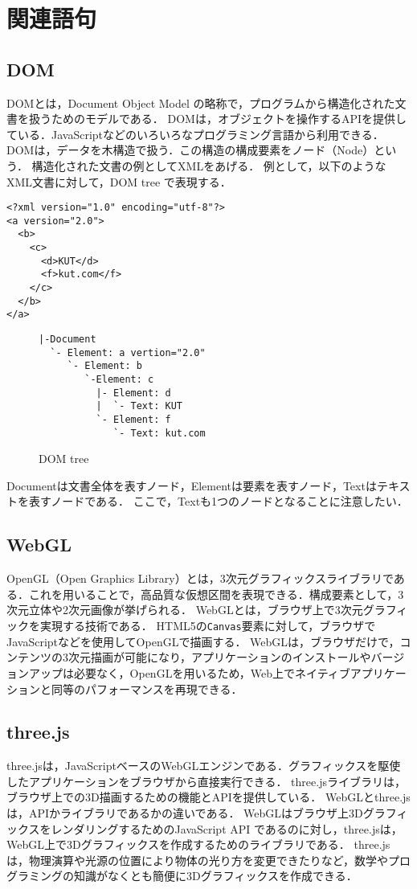 \section{関連語句}
\subsection{DOM}
DOMとは，Document Object Model の略称で，プログラムから構造化された文書を扱うためのモデルである．
DOMは，オブジェクトを操作するAPIを提供している．JavaScriptなどのいろいろなプログラミング言語から利用できる．
DOMは，データを木構造で扱う．この構造の構成要素をノード（Node）という．
構造化された文書の例としてXMLをあげる．
例として，以下のようなXML文書に対して，DOM tree で表現する．
\begin{lstlisting}[caption={XML文書},language={}]
<?xml version="1.0" encoding="utf-8"?>
<a version="2.0">
  <b>
    <c>
      <d>KUT</d>
      <f>kut.com</f>
    </c>
  </b>
</a>
\end{lstlisting}
\begin{figure}[H]
  \centering
  \begin{lstlisting}[language={}]
|-Document
  `- Element: a vertion="2.0"
     `- Element: b
        `-Element: c
          |- Element: d
          |  `- Text: KUT
          `- Element: f   
             `- Text: kut.com
            \end{lstlisting}
  \caption{DOM tree}
\end{figure}
Documentは文書全体を表すノード，Elementは要素を表すノード，Textはテキストを表すノードである．
ここで，Textも1つのノードとなることに注意したい．
\\\hfill\cite{XML文書とDOM}
\subsection{WebGL}
OpenGL（Open Graphics Library）とは，3次元グラフィックスライブラリである．これを用いることで，高品質な仮想区間を表現できる．構成要素として，3次元立体や2次元画像が挙げられる\cite{OpenGL入門}．
WebGLとは，ブラウザ上で3次元グラフィックを実現する技術である．
HTML5の\texttt{Canvas}要素に対して，ブラウザでJavaScriptなどを使用してOpenGLで描画する．
WebGLは，ブラウザだけで，コンテンツの3次元描画が可能になり，アプリケーションのインストールやバージョンアップは必要なく，OpenGLを用いるため，Web上でネイティブアプリケーションと同等のパフォーマンスを再現できる．
\\\hfill\cite{webglみずほ}
\subsection{three.js}
three.jsは，JavaScriptベースのWebGLエンジンである．グラフィックスを駆使したアプリケーションをブラウザから直接実行できる．
three.jsライブラリは，ブラウザ上での3D描画するための機能とAPIを提供している．
WebGLとthree.jsは，APIかライブラリであるかの違いである．
WebGLはブラウザ上3DグラフィックスをレンダリングするためのJavaScript API であるのに対し，three.jsは，WebGL上で3Dグラフィックスを作成するためのライブラリである．
three.jsは，物理演算や光源の位置により物体の光り方を変更できたりなど，数学やプログラミングの知識がなくとも簡便に3Dグラフィックスを作成できる．
\\\hfill\cite{three.js}